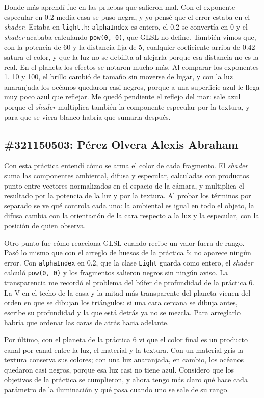 Donde más aprendí fue en las pruebas que salieron mal. Con el exponente especular en 0.2 media casa se puso negra, y yo pensé que el error estaba en el \textit{shader}. Estaba en \texttt{light.h}: \texttt{alphaIndex} es entero, el 0.2 se convertía en 0 y el \textit{shader} acababa calculando \texttt{pow(0, 0)}, que GLSL no define. También vimos que, con la potencia de 60 y la distancia fija de 5, cualquier coeficiente arriba de 0.42 satura el color, y que la luz no se debilita al alejarla porque esa distancia no es la real. En el planeta los efectos se notaron mucho más. Al comparar los exponentes 1, 10 y 100, el brillo cambió de tamaño sin moverse de lugar, y con la luz anaranjada los océanos quedaron casi negros, porque a una superficie azul le llega muy poco azul que reflejar. Me quedó pendiente el reflejo del mar: sale azul porque el \textit{shader} multiplica también la componente especular por la textura, y para que se viera blanco habría que sumarla después.

\subsection*{\#321150503: Pérez Olvera Alexis Abraham}
Con esta práctica entendí cómo se arma el color de cada fragmento. El \textit{shader} suma las componentes ambiental, difusa y especular, calculadas con productos punto entre vectores normalizados en el espacio de la cámara, y multiplica el resultado por la potencia de la luz y por la textura. Al probar los términos por separado se ve qué controla cada uno: la ambiental es igual en todo el objeto, la difusa cambia con la orientación de la cara respecto a la luz y la especular, con la posición de quien observa.

Otro punto fue cómo reacciona GLSL cuando recibe un valor fuera de rango. Pasó lo mismo que con el arreglo de huesos de la práctica 5: no aparece ningún error. Con \texttt{alphaIndex} en 0.2, que la clase \texttt{Light} guarda como entero, el \textit{shader} calculó \texttt{pow(0, 0)} y los fragmentos salieron negros sin ningún aviso. La transparencia me recordó el problema del búfer de profundidad de la práctica 6. La V en el techo de la casa y la mitad más transparente del planeta vienen del orden en que se dibujan los triángulos: si una cara cercana se dibuja antes, escribe su profundidad y la que está detrás ya no se mezcla. Para arreglarlo habría que ordenar las caras de atrás hacia adelante.

Por último, con el planeta de la práctica 6 vi que el color final es un producto canal por canal entre la luz, el material y la textura. Con un material gris la textura conserva sus colores; con una luz anaranjada, en cambio, los océanos quedaron casi negros, porque esa luz casi no tiene azul. Considero que los objetivos de la práctica se cumplieron, y ahora tengo más claro qué hace cada parámetro de la iluminación y qué pasa cuando uno se sale de su rango.


